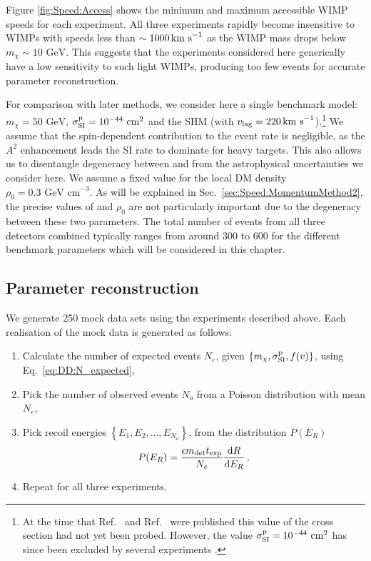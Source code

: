 Figure \ref{fig:Speed:Access} shows the minimum and maximum accessible WIMP speeds for each experiment. All three experiments rapidly become insensitive to WIMPs with speeds less than \(\sim 1000 \,\textrm{km s}^{-1}\) as the WIMP mass drops below \(m_\chi \sim 10 \textrm{ GeV}\). This suggests that the experiments considered here generically have a low sensitivity to such light WIMPs, producing too few events for accurate parameter reconstruction.

For comparison with later methods, we consider here a single benchmark model: \(m_\chi = 50 \textrm{ GeV}\), $\sigmapsi = 10^{-44} \cmsq$ and the SHM (with $v_\textrm{lag} = 220 \,\textrm{km s}^{-1}$).\footnote{At the time that Ref.~\cite{Peter:2011} and Ref.~\cite{Kavanagh:2012} were published this value of the cross section had not yet been probed. However, the value $\sigmapsi = 10^{-44} \cmsq$ has since been excluded by several experiments \cite{Aprile:2012b,Akerib:2014}.} We assume that the spin-dependent contribution to the event rate is negligible, as the $A^2$ enhancement leads the SI rate to dominate for heavy targets. This also allows us to disentangle degeneracy between \sigmapsi and \sigmapsd from the astrophysical uncertainties we consider here. We assume a fixed value for the local DM density $\rho_0 = 0.3 \textrm{ GeV cm}^{-3}$. As will be explained in Sec.~\ref{sec:Speed:MomentumMethod2}, the precise values of \sigmapsi and \(\rho_0\) are not particularly important due to the degeneracy between these two parameters. The total number of events from all three detectors combined typically ranges from around 300 to 600 for the different benchmark parameters which will be considered in this chapter.

\subsection{Parameter reconstruction}
We generate 250 mock data sets using the experiments described above. Each realisation of the mock data is generated as follows:

\begin{enumerate}
\item Calculate the number of expected events $N_e$, given $\left\{m_\chi, \sigmapsi, f(v)\right\}$, using Eq.~\ref{eq:DD:N_expected},
\item Pick the number of observed events $N_o$ from a Poisson distribution with mean $N_e$,
\item Pick recoil energies $\left\{E_1, E_2, ..., E_{N_o}\right\}$, from the distribution $P(E_R)$ 
\begin{equation}
P(E_R) = \frac{\epsilon m_\textrm{det} t_\textrm{exp}}{N_e}\frac{\mathrm{d}R}{\mathrm{d}E_R}\,,
\end{equation}
\item Repeat for all three experiments.
\end{enumerate}


